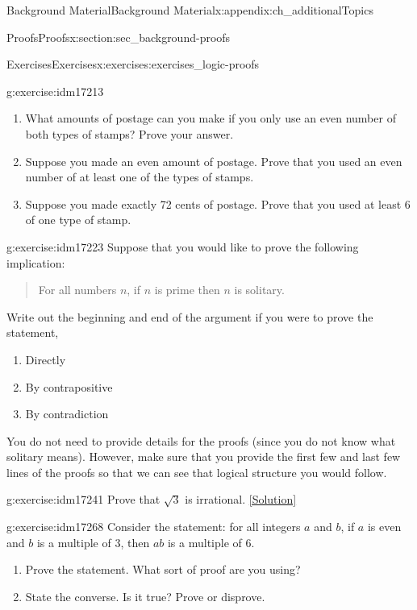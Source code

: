 \documentclass[oneside,10pt,]{book}
\numberwithin{equation}{chapter}
\begin{document}
\begin{appendixptx}{Background Material}{}{Background Material}{}{}{x:appendix:ch_additionalTopics}
\begin{sectionptx}{Proofs}{}{Proofs}{}{}{x:section:sec_background-proofs}
\begin{exercises-subsection}{Exercises}{}{Exercises}{}{}{x:exercises:exercises_logic-proofs}
\begin{divisionexercise}{4}{}{}{g:exercise:idm17213}
\begin{enumerate}[label=(\alph*)]
\item{}What amounts of postage can you make if you only use an even number of both types of stamps? Prove your answer.%
\item{}Suppose you made an even amount of postage. Prove that you used an even number of at least one of the types of stamps.%
\item{}Suppose you made exactly 72 cents of postage. Prove that you used at least 6 of one type of stamp.%
\end{enumerate}
%
\end{divisionexercise}%
\begin{divisionexercise}{5}{}{}{g:exercise:idm17223}%
Suppose that you would like to prove the following implication:%
\begin{quote}%
For all numbers \(n\), if \(n\) is prime then \(n\) is solitary.%
\end{quote}
Write out the beginning and end of the argument if you were to prove the statement,%
\par
%
\begin{enumerate}[label=(\alph*)]
\item{}Directly %
\item{}By contrapositive %
\item{}By contradiction %
\end{enumerate}
%
\par
You do not need to provide details for the proofs (since you do not know what solitary means). However, make sure that you provide the first few and last few lines of the proofs so that we can see that logical structure you would follow.%
\end{divisionexercise}%
\begin{divisionexercise}{6}{}{}{g:exercise:idm17241}%
Prove that \(\sqrt 3\) is irrational.%
\space\hspace*{0pt}\hfill{\tiny\hyperlink{g:solution:idm17245-main}{[Solution]}}\end{divisionexercise}%
\begin{divisionexercise}{7}{}{}{g:exercise:idm17268}%
Consider the statement: for all integers \(a\) and \(b\), if \(a\) is even and \(b\) is a multiple of 3, then \(ab\) is a multiple of 6.%
\par
%
\begin{enumerate}[label=(\alph*)]
\item{}Prove the statement. What sort of proof are you using?%
\item{}State the converse. Is it true? Prove or disprove.%

\end{enumerate}
\end{divisionexercise}
\end{exercises-subsection}
\end{sectionptx}
\end{appendixptx}
\end{document}
